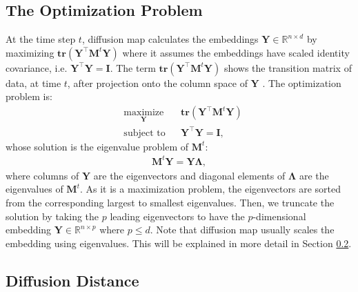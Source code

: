 \documentclass[lang=cn,10pt]{gorgeousnbook}
\numberwithin{equation}{section}%
\numberwithin{figure}{section}%
\begin{document}
\subsection{The Optimization Problem}\label{section_diffusion_map_optimization}

At the time step $t$, diffusion map 
calculates the embeddings $\boldsymbol{Y} \in \mathbb{R}^{n \times d}$ by maximizing $\textbf{tr}(\boldsymbol{Y}^\top \boldsymbol{M}^t \boldsymbol{Y})$ where it assumes the embeddings have scaled identity covariance, i.e. $\boldsymbol{Y}^\top \boldsymbol{Y} = \boldsymbol{I}$. 
The term $\textbf{tr}(\boldsymbol{Y}^\top \boldsymbol{M}^t \boldsymbol{Y})$ shows the transition matrix of data, at time $t$, after projection onto the column space of $\boldsymbol{Y}$ \cite{ghojogh2019unsupervised}.
The optimization problem is: 
\begin{equation}\label{equation_diffusion_map_optimization}
\begin{aligned}
& \underset{\boldsymbol{Y}}{\text{maximize}}
& & \textbf{tr}(\boldsymbol{Y}^\top \boldsymbol{M}^t \boldsymbol{Y}) \\
& \text{subject to}
& & 
\boldsymbol{Y}^\top \boldsymbol{Y} = \boldsymbol{I},
\end{aligned}
\end{equation}
whose solution is the eigenvalue problem of $\boldsymbol{M}^t$:
\begin{align}
\boldsymbol{M}^t \boldsymbol{Y} = \boldsymbol{Y} \boldsymbol{\Lambda},
\end{align}
where columns of $\boldsymbol{Y}$ are the eigenvectors \cite{ghojogh2019eigenvalue} and diagonal elements of $\boldsymbol{\Lambda}$ are the eigenvalues of $\boldsymbol{M}^t$. 
As it is a maximization problem, the eigenvectors are sorted from the corresponding largest to smallest eigenvalues. 
Then, we truncate the solution by taking the $p$ leading eigenvectors to have the $p$-dimensional embedding $\boldsymbol{Y} \in \mathbb{R}^{n \times p}$ where $p \leq d$. Note that diffusion map usually scales the embedding using eigenvalues. This will be explained in more detail in Section \ref{section_difusion_distance}.

\subsection{Diffusion Distance}\label{section_difusion_distance}
\end{document}
